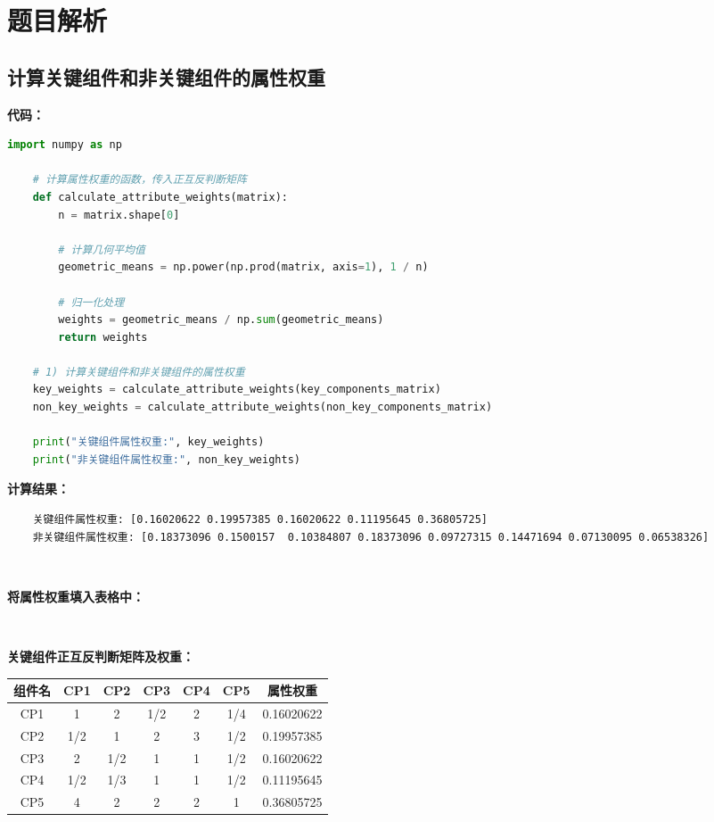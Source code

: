 \documentclass{article}
\begin{document}
\normalsize

\section{题目解析}

\subsection{计算关键组件和非关键组件的属性权重}

\textbf{代码：}

\begin{lstlisting}[language=Python]
	import numpy as np
	
	# 计算属性权重的函数，传入正互反判断矩阵
	def calculate_attribute_weights(matrix):
		n = matrix.shape[0]
		
		# 计算几何平均值
		geometric_means = np.power(np.prod(matrix, axis=1), 1 / n)
		
		# 归一化处理
		weights = geometric_means / np.sum(geometric_means)
		return weights
	
	# 1) 计算关键组件和非关键组件的属性权重
	key_weights = calculate_attribute_weights(key_components_matrix)
	non_key_weights = calculate_attribute_weights(non_key_components_matrix)
	
	print("关键组件属性权重:", key_weights)
	print("非关键组件属性权重:", non_key_weights)
\end{lstlisting}

\textbf{计算结果：}

\begin{lstlisting}
	关键组件属性权重: [0.16020622 0.19957385 0.16020622 0.11195645 0.36805725]
	非关键组件属性权重: [0.18373096 0.1500157  0.10384807 0.18373096 0.09727315 0.14471694 0.07130095 0.06538326]
\end{lstlisting}

\

\textbf{将属性权重填入表格中：}

\

\textbf{关键组件正互反判断矩阵及权重：}

\begin{center}
	\begin{tabular}{|c|c|c|c|c|c|c|}
		\hline
		组件名 & CP1 & CP2 & CP3 & CP4 & CP5 & 属性权重 \\
		\hline
		CP1 & 1 & 2 & 1/2 & 2 & 1/4 & 0.16020622 \\
		\hline
		CP2 & 1/2 & 1 & 2 & 3 & 1/2 & 0.19957385 \\
		\hline
		CP3 & 2 & 1/2 & 1 & 1 & 1/2 & 0.16020622 \\
		\hline
		CP4 & 1/2 & 1/3 & 1 & 1 & 1/2 & 0.11195645 \\
		\hline
		CP5 & 4 & 2 & 2 & 2 & 1 & 0.36805725 \\
		\hline
	\end{tabular}
\end{center}
\end{document}
